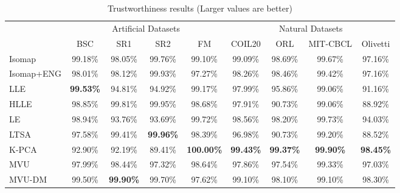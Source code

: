 \documentclass{article} %
\begin{document}
\begin{table}[t]
\caption{Trustworthiness results (Larger values are better)}
\label{tab:trustworthiness}
\begin{center}
\begin{tabular}{l|c|c|c|c||c|c|c|c}
\hline
\multicolumn{1}{c|}{} & \multicolumn{4}{c||}{Artificial Datasets} & \multicolumn{4}{c}{Natural Datasets} \\
                     & BSC & SR1 & SR2 & FM & COIL20 & ORL & MIT-CBCL & Olivetti \\
\hline
Isomap            & 99.18\% & 98.05\% & 99.76\% & 99.10\% & 99.09\% & 98.69\% & 99.67\% & 97.16\% \\
Isomap+ENG            & 98.01\% & 98.12\% & 99.93\% & 97.27\% & 98.26\% & 98.46\% & 99.42\% & 97.16\% \\
LLE            & \textbf{99.53\%} & 94.81\% & 94.92\% & 99.17\% & 97.99\% & 95.86\% & 99.06\% & 91.16\% \\
HLLE            & 98.85\% & 99.81\% & 99.95\% & 98.68\% & 97.91\% & 90.73\% & 99.06\% & 88.92\% \\
LE            & 98.94\% & 93.76\% & 93.69\% & 99.72\% & 98.56\% & 98.20\% & 99.73\% & 94.03\% \\
LTSA            & 97.58\% & 99.41\% & \textbf{99.96\%} & 98.39\% & 96.98\% & 90.73\% & 99.20\% & 88.52\% \\
K-PCA            & 92.90\% & 92.19\% & 89.41\% & \textbf{100.00\%} & \textbf{99.43\%} & \textbf{99.37\%} & \textbf{99.90\%} & \textbf{98.45\%} \\
\hline
MVU            & 97.99\% & 98.44\% & 97.32\% & 98.64\% & 97.86\% & 97.54\% & 99.33\% & 97.03\% \\
MVU-DM            & 99.50\% & \textbf{99.90\%} & 99.70\% & 97.62\% & 99.10\% & 98.10\% & 99.10\% & 98.30\% \\
\hline
\end{tabular}
\end{center}
\end{table}
\end{document}
